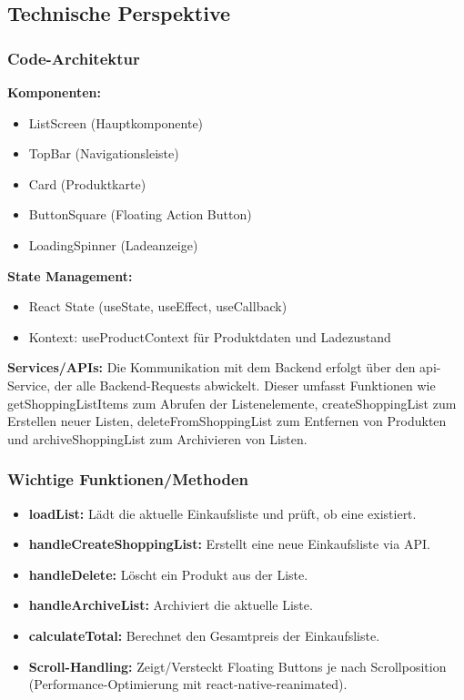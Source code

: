 \subsection{Technische Perspektive}

\subsubsection{Code-Architektur}

\textbf{Komponenten:}
\begin{itemize}
    \item ListScreen (Hauptkomponente)
    \item TopBar (Navigationsleiste)
    \item Card (Produktkarte)
    \item ButtonSquare (Floating Action Button)
    \item LoadingSpinner (Ladeanzeige)
\end{itemize}

\noindent\textbf{State Management:}
\begin{itemize}
    \item React State (useState, useEffect, useCallback)
    \item Kontext: useProductContext für Produktdaten und Ladezustand
\end{itemize}

\noindent\textbf{Services/APIs:}
Die Kommunikation mit dem Backend erfolgt über den api-Service, der alle Backend-Requests abwickelt. Dieser umfasst Funktionen wie getShoppingListItems zum Abrufen der Listenelemente, createShoppingList zum Erstellen neuer Listen, deleteFromShoppingList zum Entfernen von Produkten und archiveShoppingList zum Archivieren von Listen.

\subsubsection{Wichtige Funktionen/Methoden}
\begin{itemize}
    \item \textbf{loadList:} Lädt die aktuelle Einkaufsliste und prüft, ob eine existiert.
    \item \textbf{handleCreateShoppingList:} Erstellt eine neue Einkaufsliste via API.
    \item \textbf{handleDelete:} Löscht ein Produkt aus der Liste.
    \item \textbf{handleArchiveList:} Archiviert die aktuelle Liste.
    \item \textbf{calculateTotal:} Berechnet den Gesamtpreis der Einkaufsliste.
    \item \textbf{Scroll-Handling:} Zeigt/Versteckt Floating Buttons je nach Scrollposition (Performance-Optimierung mit react-native-reanimated).
\end{itemize}

